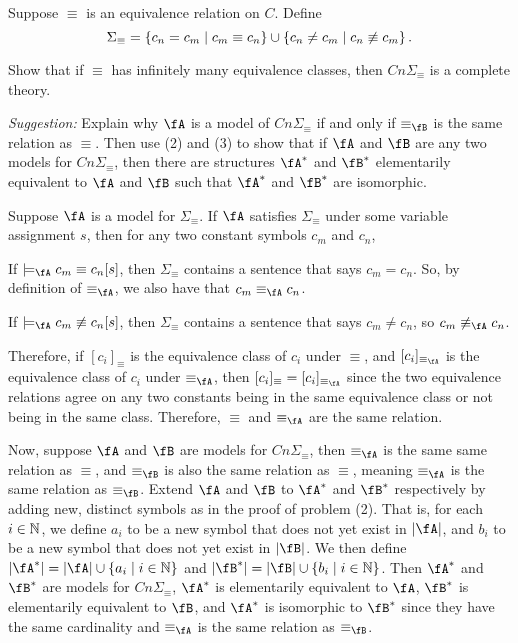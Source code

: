 \def \seq {\Sigma_\equiv}
\begin{problem}
  Suppose $\equiv$ is an equivalence relation on $C$. Define
  \[ \Sigma_\equiv = \left\{ c_n = c_m \mid c_m \equiv c_n\right\}
      \cup \left\{c_n \ne c_m \mid c_n \not\equiv c_m \right\}. \]

  Show that if $\equiv$ has infinitely many equivalence classes, then
  $Cn \Sigma_\equiv$ is a complete theory.

  \emph{Suggestion: } Explain why $\fA$ is a model of $Cn \Sigma_\equiv$
  if and only if $\equiv_\fB$ is the same relation as $\equiv$.
  Then use (2) and (3) to show that if $\fA$ and $\fB$ are
  any two models for $Cn \Sigma_\equiv$, then there are structures
  $\fA^*$ and $\fB^*$ elementarily equivalent to $\fA$ and $\fB$
  such that $\fA^*$ and $\fB^*$ are isomorphic.
\end{problem}
\begin{Answer}
  Suppose $\fA$ is a model for $\Sigma_\equiv$.
  If $\fA$ satisfies $\Sigma_\equiv$ under some variable assignment
  $s$, then for any two constant symbols $c_m$ and $c_n$,
  \begin{enumroman}
    \item If $\models_\fA c_m \equiv c_n [s]$,
      then $\Sigma_\equiv$ contains a sentence
      that says $c_m = c_n$. So, by definition of $\equiv_\fA$,
      we also have that $c_m \equiv_\fA c_n$.
    \item If $\models_\fA c_m \nequiv c_n [s]$,
      then $\Sigma_\equiv$ contains a sentence that says $c_m \ne c_n$,
      so $c_m \nequiv_\fA c_n$.
  \end{enumroman}
  Therefore, 
  if $[c_i]_\equiv$ is the equivalence class of $c_i$ under $\equiv$,
  and $[c_i]_{\equiv_\fA}$ is the equivalence class of $c_i$ under
  $\equiv_\fA$, then $[c_i]_\equiv = [c_i]_{\equiv_\fA}$
  since the two equivalence relations agree on any two constants being in
  the same equivalence class or not being in the same class.
  Therefore, $\equiv$ and $\equiv_\fA$ are the same relation.

  \bigskip
  Now, suppose $\fA$ and $\fB$ are models for $Cn \Sigma_\equiv$,
  then $\equiv_\fA$ is the same same relation as $\equiv$, and $\equiv_\fB$
  is also the same relation as $\equiv$, meaning $\equiv_\fA$ is the same
  relation as $\equiv_\fB$.
  Extend $\fA$ and $\fB$ to $\fA^*$ and $\fB^*$ respectively
  by adding new, distinct symbols as in the proof of problem (2).
  That is, for each $i \in \mathbb{N}$, we define $a_i$ to be a new symbol
  that does not yet exist in $\abs{\fA}$, and $b_i$ to be a new
  symbol that does not yet exist in $\abs{\fB}$.
  We then define $\abs{\fA^*} = \abs{\fA} \cup \set{a_i \mid i \in \N}$
  and $\abs{\fB^*} = \abs{\fB} \cup \set{b_i \mid i \in \N}$.
  Then $\fA^*$ and $\fB^*$ are models for $Cn \Sigma_\equiv$,
  $\fA^*$ is elementarily equivalent to $\fA$, $\fB^*$ is elementarily
  equivalent to $\fB$, and $\fA^*$ is isomorphic to $\fB^*$
  since they have the same cardinality and $\equiv_\fA$ is the same
  relation as $\equiv_\fB$.

\end{Answer}

